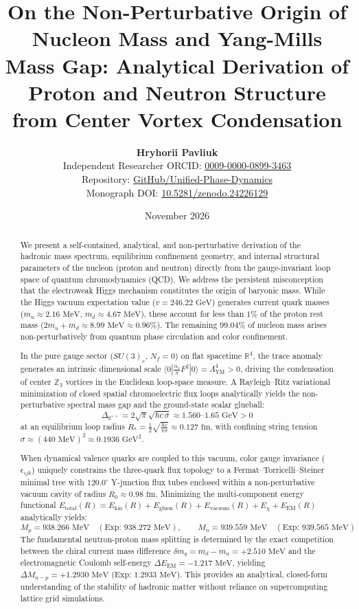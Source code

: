 \documentclass[11pt,a4paper]{article}
\title{\textbf{On the Non-Perturbative Origin of Nucleon Mass and Yang-Mills Mass Gap: Analytical Derivation of Proton and Neutron Structure from Center Vortex Condensation}}
\author{\textbf{Hryhorii Pavliuk}\\
\small Independent Researcher \quad\textbar\quad \small ORCID: \href{https://orcid.org/0009-0000-0899-3463}{0009-0000-0899-3463}\\
\small 
\small Repository: \href{https://github.com/hrpavliuk-byte/Unified-Phase-Dynamics-Feynman-Path-Contours}{GitHub/Unified-Phase-Dynamics}\\
\small Monograph DOI: \href{https://doi.org/10.5281/zenodo.24226129}{10.5281/zenodo.24226129}}
\date{November 2026}
\begin{document}
\maketitle

\begin{abstract}
We present a self-contained, analytical, and non-perturbative derivation of the hadronic mass spectrum, equilibrium confinement geometry, and internal structural parameters of the nucleon (proton and neutron) directly from the gauge-invariant loop space of quantum chromodynamics (QCD). We address the persistent misconception that the electroweak Higgs mechanism constitutes the origin of baryonic mass. While the Higgs vacuum expectation value ($v = 246.22\text{ GeV}$) generates current quark masses ($m_u \approx 2.16\text{ MeV}$, $m_d \approx 4.67\text{ MeV}$), these account for less than $1\%$ of the proton rest mass ($2m_u + m_d \approx 8.99\text{ MeV} \approx 0.96\%$). The remaining $99.04\%$ of nucleon mass arises non-perturbatively from quantum phase circulation and color confinement.

In the pure gauge sector ($SU(3)_c$, $N_f = 0$) on flat spacetime $\mathbb{R}^4$, the trace anomaly generates an intrinsic dimensional scale $\langle 0 | \frac{\alpha_s}{\pi} F^2 | 0 \rangle = \Lambda_{\mathrm{YM}}^4 > 0$, driving the condensation of center $\mathbb{Z}_3$ vortices in the Euclidean loop-space measure. A Rayleigh--Ritz variational minimization of closed spatial chromoelectric flux loops analytically yields the non-perturbative spectral mass gap and the ground-state scalar glueball:
$$\Delta_{0^{++}} = 2\sqrt{\pi} \sqrt{\hbar c \, \sigma} \approx 1.560\text{--}1.65\text{ GeV} > 0$$
at an equilibrium loop radius $R_* = \frac{1}{2}\sqrt{\frac{\hbar c}{\pi\sigma}} \approx 0.127\text{ fm}$, with confining string tension $\sigma \approx (440\text{ MeV})^2 \approx 0.1936\text{ GeV}^2$.

When dynamical valence quarks are coupled to this vacuum, color gauge invariance ($\epsilon_{ijk}$) uniquely constrains the three-quark flux topology to a Fermat--Torricelli--Steiner minimal tree with $120.0^\circ$ Y-junction flux tubes enclosed within a non-perturbative vacuum cavity of radius $R_0 \approx 0.98\text{ fm}$. Minimizing the multi-component energy functional $E_{\mathrm{total}}(R) = E_{\mathrm{kin}}(R) + E_{\mathrm{gluon}}(R) + E_{\mathrm{vacuum}}(R) + E_{\chi} + E_{\mathrm{EM}}(R)$ analytically yields:
$$M_p = 938.266\text{ MeV} \quad (\text{Exp: } 938.272\text{ MeV}), \qquad M_n = 939.559\text{ MeV} \quad (\text{Exp: } 939.565\text{ MeV})$$
The fundamental neutron-proton mass splitting is determined by the exact competition between the chiral current mass difference $\delta m_q = m_d - m_u = +2.510\text{ MeV}$ and the electromagnetic Coulomb self-energy $\Delta E_{\mathrm{EM}} = -1.217\text{ MeV}$, yielding $\Delta M_{n-p} = +1.2930\text{ MeV}$ (Exp: $1.2933\text{ MeV}$). This provides an analytical, closed-form understanding of the stability of hadronic matter without reliance on supercomputing lattice grid simulations.
\end{abstract}
\end{document}
